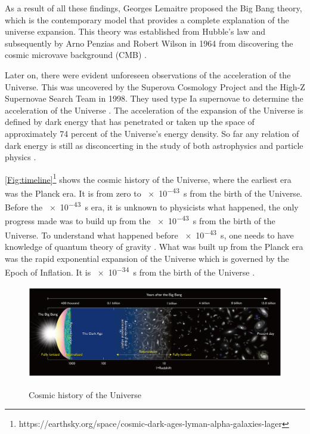 \documentclass[12pt,a4paper]{report}
\begin{document}
		As a result of all these findings, Georges Lemaitre proposed the Big Bang theory, which is the contemporary model that provides a complete explanation of the universe expansion. This theory was established from Hubble's law and subsequently by Arno Penzias and Robert Wilson in 1964 from discovering the cosmic microvave background (CMB) \cite{2018EPJH...43...73O,2003RvMP...75..559P,1929PNAS...15..168H}.
		
		Later on, there were evident unforeseen observations of the acceleration of the Universe. This was uncovered by the Superova Cosmology Project and the High-Z Supernovae Search Team in 1998. They used type Ia supernovae to determine the acceleration of the Universe \cite{1998AJ....116.1009R, 1999ApJ...517..565P}. The acceleration of the expansion of the Universe is defined by dark energy that has penetrated or taken up the space of approximately 74 percent of the Universe's energy density. So far any relation of dark energy is still as disconcerting in the study of both astrophysics and particle physics \cite{2008ARA&A..46..385F, 2015Sci...349..849H}.
		
		\autoref{Fig:timeline}\footnote{https://earthsky.org/space/cosmic-dark-ages-lyman-alpha-galaxies-lager} shows the cosmic history of the Universe, where the earliest era was the Planck era. It is from zero to \SI{e-43}{s} from the birth of the Universe. Before the \SI{e-43}{s} era, it is unknown to physicists what happened, the only progress made was to build up from the \SI{e-43}{s} from the birth of the Universe. To understand what happened before \SI{e-43}{s}, one needs to have knowledge of quantum theory of gravity \cite{2015Sci...349..849H}. What was built up from the Planck era was the rapid exponential expansion of the Universe which is governed by the Epoch of Inflation. It is \SI{e-34}{s} from the birth of the Universe \cite{Planck}.
			\begin{figure}[htb!]
				\begin{center}
					\includegraphics[width=0.95\linewidth]{Figures/Reionizationtimeline.jpg}\\
					\caption{Cosmic history of the Universe}
					\label{Fig:timeline}
				\end{center}
			\end{figure}
		
\end{document}
